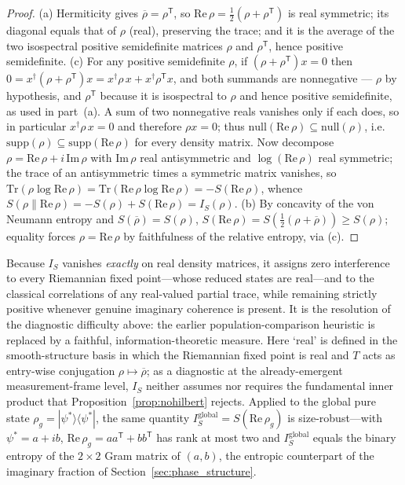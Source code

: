 \documentclass[12pt,a4paper]{article}
\theoremstyle{definition}
\theoremstyle{remark}
\begin{document}
\begin{proof}
(a) Hermiticity gives $\overline{\rho} = \rho^{\mathsf T}$, so
$\mathrm{Re}\,\rho = \tfrac12(\rho + \rho^{\mathsf T})$ is real symmetric;
its diagonal equals that of $\rho$ (real), preserving the trace; and it is
the average of the two isospectral positive semidefinite matrices $\rho$
and $\rho^{\mathsf T}$, hence positive semidefinite. (c) For any positive
semidefinite $\rho$, if $(\rho+\rho^{\mathsf T})x=0$ then
$0 = x^{\dagger}(\rho+\rho^{\mathsf T})x
   = x^{\dagger}\rho\,x + x^{\dagger}\rho^{\mathsf T}x$,
and both summands are nonnegative --- $\rho$ by hypothesis, and
$\rho^{\mathsf T}$ because it is isospectral to $\rho$ and hence positive
semidefinite, as used in part~(a). A sum of two nonnegative reals vanishes
only if each does, so in particular $x^{\dagger}\rho\,x = 0$ and therefore
$\rho x = 0$; thus
$\mathrm{null}(\mathrm{Re}\,\rho)\subseteq\mathrm{null}(\rho)$, i.e.\
$\mathrm{supp}(\rho)\subseteq\mathrm{supp}(\mathrm{Re}\,\rho)$ for every
density matrix. Now decompose $\rho = \mathrm{Re}\,\rho + i\,\mathrm{Im}\,\rho$ with
$\mathrm{Im}\,\rho$ real antisymmetric and $\log(\mathrm{Re}\,\rho)$ real
symmetric; the trace of an antisymmetric times a symmetric matrix vanishes,
so $\mathrm{Tr}(\rho \log \mathrm{Re}\,\rho) = \mathrm{Tr}(\mathrm{Re}\,\rho
\log \mathrm{Re}\,\rho) = -S(\mathrm{Re}\,\rho)$, whence
$S(\rho\|\mathrm{Re}\,\rho) = -S(\rho) + S(\mathrm{Re}\,\rho) = I_S(\rho)$.
(b) By concavity of the von Neumann entropy and $S(\overline\rho) =
S(\rho)$, $S(\mathrm{Re}\,\rho) = S(\tfrac12(\rho+\overline\rho)) \geq
S(\rho)$; equality forces $\rho = \mathrm{Re}\,\rho$ by faithfulness of the
relative entropy, via (c).
\end{proof}

Because $I_S$ vanishes \emph{exactly} on real density matrices, it assigns
zero interference to every Riemannian fixed point---whose reduced states
are real---and to the classical correlations of any real-valued partial
trace, while remaining strictly positive whenever genuine imaginary
coherence is present. It is the resolution of the diagnostic difficulty
above: the earlier population-comparison heuristic is replaced by a
faithful, information-theoretic measure. Here `real' is defined in the
smooth-structure basis in which the Riemannian fixed point is real and $T$
acts as entry-wise conjugation $\rho\mapsto\overline\rho$; as a diagnostic
at the already-emergent measurement-frame level, $I_S$ neither assumes nor
requires the fundamental inner product that Proposition~\ref{prop:nohilbert}
rejects. Applied to the global pure state
$\rho_g = |\psi^*\rangle\langle\psi^*|$, the same quantity
$I_S^{\mathrm{global}} = S(\mathrm{Re}\,\rho_g)$ is size-robust---with
$\psi^* = a + i b$, $\mathrm{Re}\,\rho_g = a a^{\mathsf T} + b b^{\mathsf
T}$ has rank at most two and $I_S^{\mathrm{global}}$ equals the binary
entropy of the $2\times2$ Gram matrix of $(a,b)$, the entropic counterpart
of the imaginary fraction of Section~\ref{sec:phase_structure}.
\end{document}
